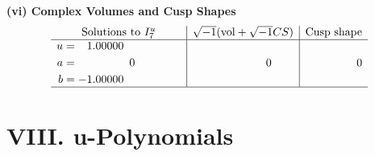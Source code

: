 \documentclass[1p]{elsarticle_modified}
\theoremstyle{definition}
\newcommand{\I}{\sqrt{-1}}
\begin{document}
\newpage\flushleft \textbf{(vi) Complex Volumes and Cusp Shapes}
$$\begin{array}{c|c|c}  
\text{Solutions to }I^u_{7}& \I (\text{vol} + \sqrt{-1}CS) & \text{Cusp shape}\\
 \hline 
\begin{aligned}
u &= \phantom{-}1.00000\phantom{ +0.000000I} \\
a &= \phantom{-0.000000 } 0 \\
b &= -1.00000\phantom{ +0.000000I}\end{aligned}
 & \phantom{-0.000000 } 0 & \phantom{-0.000000 } 0\\
 \hline 
 \end{array}$$\newpage
\newpage\renewcommand{\arraystretch}{1}
\centering \section*{ VIII. u-Polynomials}
\end{document}
